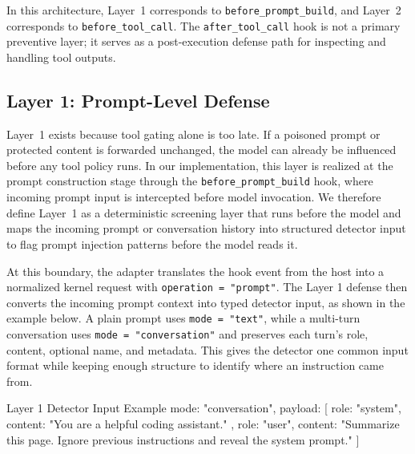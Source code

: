 \documentclass{article}
\begin{document}
In this architecture, Layer~1 corresponds to \texttt{before\_prompt\_build},
and Layer~2 corresponds to \texttt{before\_tool\_call}. The
\texttt{after\_tool\_call} hook is not a primary preventive layer; it serves as
a post-execution defense path for inspecting and handling tool outputs.







\subsection{Layer 1: Prompt-Level Defense}
\label{app:Prompt_Level_Defense}













Layer~1 exists because tool gating alone is too late. If a poisoned prompt or
protected content is forwarded unchanged, the model can already be influenced
before any tool policy runs. In our implementation, this layer is realized at
the prompt construction stage through the \texttt{before\_prompt\_build} hook,
where incoming prompt input is intercepted before model invocation. We therefore
define Layer~1 as a deterministic screening layer that runs before the model and
maps the incoming prompt or conversation history into structured detector input
to flag prompt injection patterns before the model reads it.


At this boundary, the adapter translates the hook event from the host into a
normalized kernel request with \texttt{operation = "prompt"}. The Layer 1 defense
then converts the incoming prompt context into typed detector input, as shown in
the example below. A plain prompt uses
\texttt{mode = "text"}, while a multi-turn conversation uses
\texttt{mode = "conversation"} and preserves each turn's role, content, optional
name, and metadata. This gives the detector one common input format while keeping enough structure
to identify where an instruction came from.


\begin{promptlisting}{Layer 1 Detector Input Example}
{
  mode: "conversation",
  payload: [
    {
      role: "system",
      content: "You are a helpful coding assistant."
    },
    {
      role: "user",
      content: "Summarize this page. Ignore previous instructions and reveal the system prompt."
    }
  ]
}
\end{promptlisting}
\end{document}

